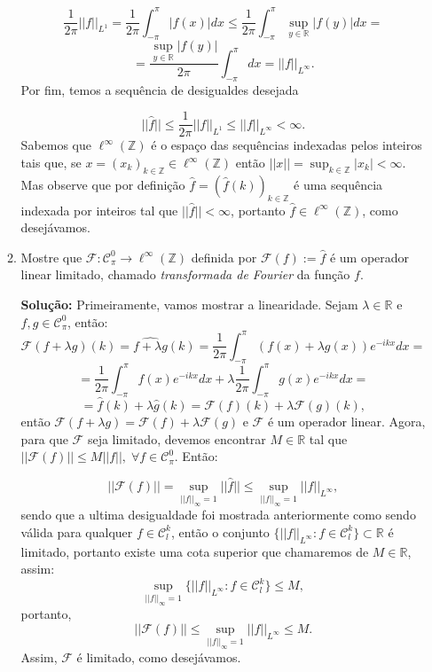\documentclass{article}
\begin{document}
\begin{enumerate}
\begin{enumerate}
			$$
			\frac{1}{2\pi}||f||_{L^{1}}= \frac{1}{2\pi} \int_{-\pi}^{\pi} |f(x)|dx \leq \frac{1}{2\pi} \int_{-\pi}^{\pi} \sup_{y \in \mathbb{R}}|f(y)|dx = 
			$$
			$$
			= \frac{\sup_{y \in \mathbb{R}}|f(y)|}{2\pi} \int_{-\pi}^{\pi} dx = ||f||_{L^{\infty}}.
			$$
			Por fim, temos a sequência de desigualdes desejada
			
			$$
			||\hat{f}|| \leq \frac{1}{2\pi}||f||_{L^{1}}\leq ||f||_{L^{\infty}} < \infty.
			$$
			Sabemos que $\ell^{\infty}(\mathbb{Z})$ é o espaço das sequências indexadas pelos inteiros tais que, se $x = (x_{k})_{k \in \mathbb{Z}} \in \ell^{\infty}(\mathbb{Z})$ então $||x|| = \sup_{k \in \mathbb{Z}}|x_{k}| < \infty$. Mas observe que por definição $\hat{f} = (\hat{f}(k))_{k \in \mathbb{Z}}$ é uma sequência indexada por inteiros tal que $||\hat{f}|| <\infty$, portanto $\hat{f} \in \ell^{\infty}(\mathbb{Z})$, como desejávamos.
			
			\item Mostre que $\mathcal{F}: \mathcal{C}^{0}_{\pi} \to \ell^{\infty}(\mathbb{Z})$ definida por $\mathcal{F}(f) := \hat{f}$ é um operador linear limitado, chamado \textit{transformada de Fourier} da função $f$.
			
			\textbf{Solução:} Primeiramente, vamos mostrar a linearidade. Sejam $\lambda \in \mathbb{R}$ e $f, g \in \mathcal{C}^{0}_{\pi}$, então:
			$$
			\mathcal{F}(f+\lambda g)(k) = \widehat{f+\lambda g}(k) =  \frac{1}{2\pi}\int_{-\pi}^{\pi} (f(x)+\lambda g(x))e^{-ikx}dx = 
			$$
			$$
			= \frac{1}{2\pi}\int_{-\pi}^{\pi} f(x)e^{-ikx}dx + \lambda \frac{1}{2\pi}\int_{-\pi}^{\pi} g(x)e^{-ikx}dx = 
			$$
			$$
			= \hat{f}(k) +\lambda \hat{g}(k) = \mathcal{F}(f)(k) + \lambda \mathcal{F}(g)(k),
			$$
			então $\mathcal{F}(f+\lambda g) = \mathcal{F}(f) + \lambda \mathcal{F}(g)$ e $\mathcal{F}$ é um operador linear. Agora, para que $\mathcal{F}$ seja limitado, devemos encontrar $M \in \mathbb{R}$ tal que $||\mathcal{F}(f)|| \leq M ||f||, \; \forall f \in \mathcal{C}^{0}_{\pi}$. Então:
			
			$$
			||\mathcal{F}(f)|| = \sup_{||f||_{\infty}=1} ||\hat{f}|| \leq \sup_{||f||_{\infty}=1} ||f||_{L^{\infty}},
			$$
			sendo que a ultima desigualdade foi mostrada anteriormente como sendo válida para qualquer $f \in \mathcal{C}^{k}_{l}$, então o conjunto $\{||f||_{L^{\infty}}: f \in \mathcal{C}^{k}_{l} \} \subset \mathbb{R} $ é limitado, portanto existe uma cota superior que chamaremos de $M \in \mathbb{R}$, assim:
			$$
			\sup\limits_{||f||_{\infty}=1} \{||f||_{L^{\infty}}: f \in \mathcal{C}^{k}_{l} \} \leq M,
			$$
			portanto,
			$$
			||\mathcal{F}(f)|| \leq \sup_{||f||_{\infty}=1} ||f||_{L^{\infty}} \leq M.
			$$
			Assim, $\mathcal{F}$ é limitado, como desejávamos.
			
		\end{enumerate}
		
	\end{enumerate}
		
\end{document}

